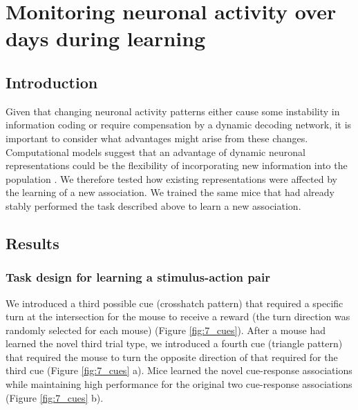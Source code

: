 \chapter{Monitoring neuronal activity over days during learning} \label{chapter_4}

\section{Introduction}\label{sec:chap4_intro}

Given that changing neuronal activity patterns either cause some instability in information coding or require compensation by a dynamic decoding network, it is important to consider what advantages might arise from these changes. Computational models suggest that an advantage of dynamic neuronal representations could be the flexibility of incorporating new information into the population \citep{Ajemian2013, Rokni2007a}. We therefore tested how existing representations were affected by the learning of a new association. We trained the same mice that had already stably performed the task described above to learn a new association.

\section{Results} \label{sec:chap4_results}

\subsection{Task design for learning a stimulus-action pair} \label{chap4:stim_action}

 We introduced a third possible cue (crosshatch pattern) that required a specific turn at the intersection for the mouse to receive a reward (the turn direction was randomly selected for each mouse) (Figure \ref{fig:7_cues}). After a mouse had learned the novel third trial type, we introduced a fourth cue (triangle pattern) that required the mouse to turn the opposite direction of that required for the third cue (Figure \ref{fig:7_cues} a). Mice learned the novel cue-response associations while maintaining high performance for the original two cue-response associations (Figure \ref{fig:7_cues} b).


